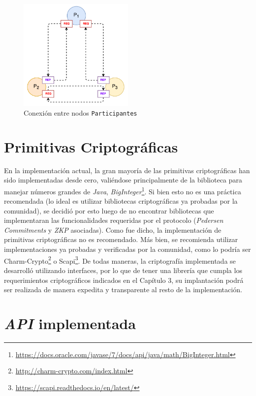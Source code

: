 \begin{figure}[H]
  \centering
    \includegraphics[width=0.5\textwidth]{imagenes/participants_connection.pdf}
  \caption{Conexión entre nodos \texttt{Participantes}}
  \label{fig:connections-participants}
\end{figure}

\section{Primitivas Criptográficas}

En la implementación actual, la gran mayoría de las primitivas criptográficas 
han sido implementadas desde cero, valiéndose principalmente de la biblioteca 
para manejar números grandes de \emph{Java}, \emph{BigInteger}\footnote{\url{
https://docs.oracle.com/javase/7/docs/api/java/math/BigInteger.html}}. Si bien 
esto no es una práctica recomendada (lo ideal es utilizar bibliotecas 
criptográficas ya probadas por la comunidad), se decidió por esto luego de no 
encontrar bibliotecas que implementaran las funcionalidades requeridas por el 
protocolo (\emph{Pedersen Commitments} y \emph{ZKP} asociadas). Como fue 
dicho, la implementación de primitivas criptográficas no es recomendado. Más 
bien, se recomienda utilizar implementaciones ya probadas y verificadas por la 
comunidad, como lo podría ser 
Charm-Crypto\footnote{\url{http://charm-crypto.com/index.html}} o 
Scapi\footnote{\url{https://scapi.readthedocs.io/en/latest/}}. De todas 
maneras, la criptografía implementada se desarrolló utilizando interfaces, por 
lo que de tener una librería que cumpla los requerimientos criptográficos 
indicados en el Capítulo 3, su implantación podrá ser realizada de manera 
expedita y transparente al resto de la implementación.

\section{\emph{API} implementada}

